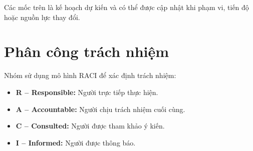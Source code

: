 Các mốc trên là kế hoạch dự kiến và có thể được cập nhật khi phạm vi,
tiến độ hoặc nguồn lực thay đổi.

\section{Phân công trách nhiệm}

Nhóm sử dụng mô hình RACI để xác định trách nhiệm:

\begin{itemize}
	\item \textbf{R -- Responsible:} Người trực tiếp thực hiện.
	\item \textbf{A -- Accountable:} Người chịu trách nhiệm cuối cùng.
	\item \textbf{C -- Consulted:} Người được tham khảo ý kiến.
	\item \textbf{I -- Informed:} Người được thông báo.
\end{itemize}

